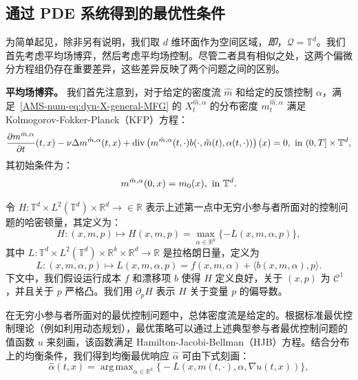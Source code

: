 \documentclass{amsproc}
\theoremstyle{definition}
\theoremstyle{remark}
\numberwithin{equation}{section}
\newcommand{\RR}{{\mathbb R}}
\newcommand{\TT}{{\mathbb T}}
\newcommand{\ctrl}{\alpha}
\newcommand{\ctrldim}{k}
\newcommand{\dom}{\mathcal{Q}}
\DeclareMathOperator*{\argmax}{arg\,max}
\newcommand{\diver}{\mathrm{div}}
\begin{document}
\subsection{通过 PDE 系统得到的最优性条件}
\label{AMS-num-sec:PDEsystem}

为简单起见，除非另有说明，我们取 $d$ 维环面作为空间区域，\textit{即}，$\dom = \TT^d$。我们首先考虑平均场博弈，然后考虑平均场控制。尽管二者具有相似之处，这两个偏微分方程组仍存在重要差异，这些差异反映了两个问题之间的区别。




\textbf{平均场博弈。} 我们首先注意到，对于给定的密度流 $\hat{m}$ 和给定的反馈控制 $\ctrl$，满足~\eqref{AMS-num-eq:dyn-X-general-MFG} 的 $X^{\hat{m}, \ctrl}_t$ 的分布密度 $m^{\hat{m}, \ctrl}_t$ 满足 Kolmogorov-Fokker-Planck（KFP）方程：
\begin{equation}
\label{AMS-num-eq:KFP-ctrl}
	\frac{\partial m^{\hat{m}, \ctrl}}{\partial t}(t,x)  - \nu \Delta m^{\hat{m}, \ctrl}(t,x) + \diver\left( m^{\hat{m}, \ctrl}(t,\cdot) b(\cdot, \hat m(t), \ctrl(t,\cdot)) \right)(x) = 0, 
	\hbox{ in } (0,T] \times \TT^d ,
\end{equation}
其初始条件为：
\begin{equation}
\label{AMS-num-eq:KFP-ctrl-init}
	m^{\hat{m}, \ctrl}(0,x) = m_0(x), 
	\hbox{ in } \TT^d.
\end{equation}

令 $H: \TT^d \times L^2(\TT^d) \times \RR^d  \to \in \RR$ 表示上述第一点中无穷小参与者所面对的控制问题的哈密顿量，其定义为：
$$
	H: (x,m,p) \mapsto H(x,m,p) = \max_{\ctrl \in \RR^\ctrldim} \{ -L(x,m,\ctrl,p) \},
$$
其中 $L: \TT^d \times L^2(\TT^d) \times \RR^\ctrldim \times \RR^d \to  \RR$ 是拉格朗日量，定义为
$$
L: (x,m,\ctrl,p) \mapsto L(x,m,\ctrl,p) =
f(x,m,\ctrl) + \langle b(x,m,\ctrl) , p \rangle.
$$
下文中，我们假设运行成本 $f$ 和漂移项 $b$ 使得 $H$ 定义良好，关于 $(x,p)$ 为 $\mathcal{C}^1$，并且关于 $p$ 严格凸。我们用 $\partial_p H$ 表示 $H$ 关于变量 $p$ 的偏导数。



在无穷小参与者所面对的最优控制问题中，总体密度流是给定的。根据标准最优控制理论（例如利用动态规划），最优策略可以通过上述典型参与者最优控制问题的值函数 $u$ 来刻画，该函数满足 Hamilton-Jacobi-Bellman（HJB）方程。结合分布上的均衡条件，我们得到均衡最优响应 $\hat{\ctrl}$ 可由下式刻画：
$$
	\hat{\ctrl}(t,x) = \argmax_{\ctrl \in \RR^\ctrldim} \big\{ -L(x, m(t,\cdot), \ctrl, \nabla u(t,x))  \big\},
$$
\end{document}
